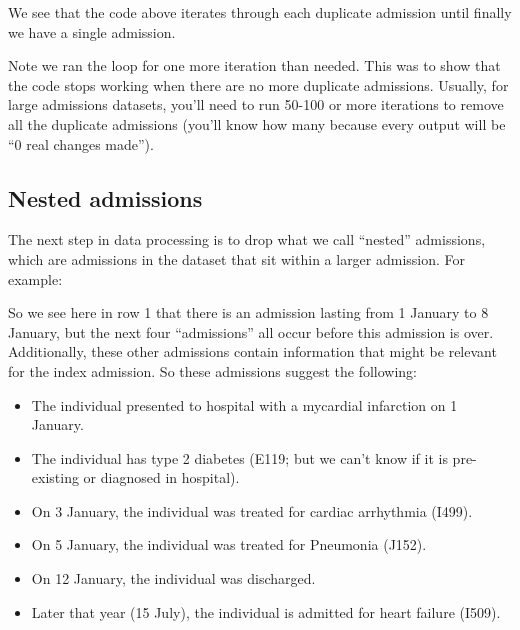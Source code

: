 \documentclass[11pt]{article}
\begin{document}
\color{Blue4}
\begin{stlog}\end{stlog}
\color{black}

We see that the code above iterates through each duplicate admission until
finally we have a single admission.

Note we ran the loop for one more iteration than needed. This was
to show that the code stops working when there are no more duplicate admissions. 
Usually, for large admissions datasets, you'll need to run 50-100 or more
iterations to remove all the duplicate admissions (you'll know how many because 
every output will be ``0 real changes made''). 

\clearpage
\subsection{Nested admissions}

The next step in data processing is to drop what we call ``nested'' admissions, 
which are admissions in the dataset that sit within a larger admission. 
For example:

\color{Blue4}
\begin{stlog}\end{stlog}
\color{black}

So we see here in row 1 that there is an admission lasting from 1 January
to 8 January, but the next four ``admissions'' all occur before this admission
is over. 
Additionally, these other admissions contain information that might be relevant
for the index admission. 
So these admissions suggest the following:
\begin{itemize}
\item The individual presented to hospital with a mycardial infarction on 1 January.
\item The individual has type 2 diabetes (E119; but we can't know if it is pre-existing or diagnosed
in hospital).
\item On 3 January, the individual was treated for cardiac arrhythmia (I499).
\item On 5 January, the individual was treated for Pneumonia (J152).
\item On 12 January, the individual was discharged.
\item Later that year (15 July), the individual is admitted for heart failure (I509).
\end{itemize}
\end{document}
